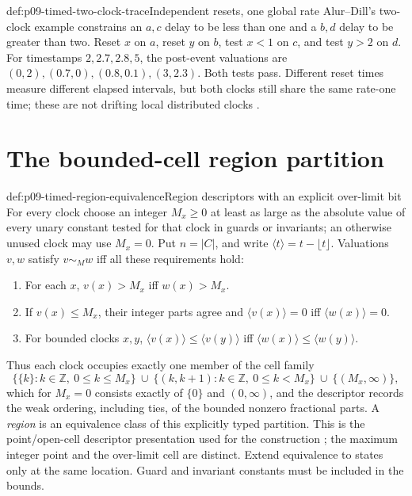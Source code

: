 \begin{hbexample}{def:p09-timed-two-clock-trace}{Independent resets, one global rate}
Alur--Dill's two-clock example constrains an \(a,c\) delay to be less than
one and a \(b,d\) delay to be greater than two. Reset \(x\) on \(a\),
reset \(y\) on \(b\), test \(x<1\) on \(c\), and test \(y>2\) on
\(d\). For timestamps \(2,2.7,2.8,5\), the post-event valuations are
\((0,2),(0.7,0),(0.8,0.1),(3,2.3)\). Both tests pass. Different reset
times measure different elapsed intervals, but both clocks still share the
same rate-one time; these are not drifting local distributed clocks
\cite[exs.~3.5,3.9, pp.~192--195]{AlurDill1994TimedOriginal}.
\end{hbexample}

\section{The bounded-cell region partition}
\label{sec:p09-timed-region-partition}

\begin{hbdefinition}{def:p09-timed-region-equivalence}{Region descriptors with an explicit over-limit bit}
For every clock choose an integer \(M_x\geq0\) at least as large as the
absolute value of every unary constant tested for that clock in guards or
invariants; an otherwise unused clock may use \(M_x=0\). Put
\(n=|C|\), and write \(\langle t\rangle=t-\lfloor t\rfloor\).
Valuations \(v,w\) satisfy \(v\sim_M w\) iff all these requirements hold:

\begin{enumerate}
\item For each \(x\), \(v(x)>M_x\) iff \(w(x)>M_x\).
\item If \(v(x)\leq M_x\), their integer parts agree and
      \(\langle v(x)\rangle=0\) iff \(\langle w(x)\rangle=0\).
\item For bounded clocks \(x,y\),
      \(\langle v(x)\rangle\leq\langle v(y)\rangle\) iff
      \(\langle w(x)\rangle\leq\langle w(y)\rangle\).
\end{enumerate}

Thus each clock occupies exactly one member of the cell family
\[
 \bigl\{\{k\}:k\in\mathbb Z,\ 0\leq k\leq M_x\bigr\}
 \ \cup\ \bigl\{(k,k+1):k\in\mathbb Z,\ 0\leq k<M_x\bigr\}
 \ \cup\ \bigl\{(M_x,\infty)\bigr\},
\]
which for \(M_x=0\) consists exactly of \(\{0\}\) and
\((0,\infty)\),
and the descriptor records the weak ordering, including ties, of the
bounded nonzero fractional parts. A \emph{region} is an equivalence class
of this explicitly typed partition. This is the point/open-cell
descriptor presentation used for the construction
\cite[\S4.2]{AlurDill1994TimedOriginal}; the maximum integer point and the
over-limit cell are distinct. Extend equivalence to states only at the same
location. Guard and invariant constants must be included in the bounds.
\end{hbdefinition}

